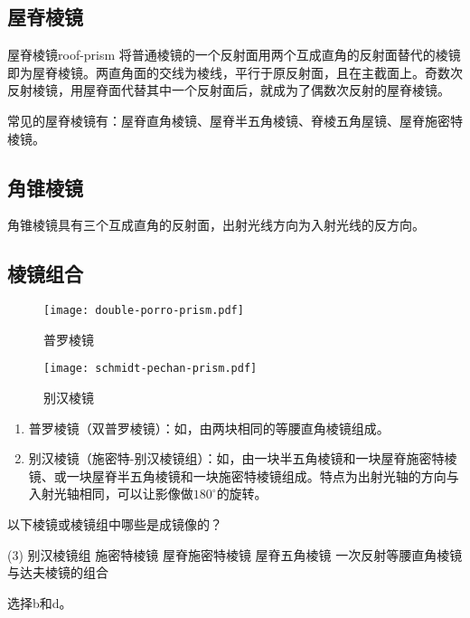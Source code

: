 \documentclass[cn,10pt,chinesefont=founder,math=mtpro2,cite=super,toc=onecol,twoside,openany]{elegantbook}
\begin{document}
\subsection{屋脊棱镜}

\begin{definition}{屋脊棱镜}{roof-prism}
	将普通棱镜的一个反射面用两个互成直角的反射面替代的棱镜即为屋脊棱镜。两直角面的交线为棱线，平行于原反射面，且在主截面上。奇数次反射棱镜，用屋脊面代替其中一个反射面后，就成为了偶数次反射的屋脊棱镜。
\end{definition}

常见的屋脊棱镜有：屋脊直角棱镜、屋脊半五角棱镜、脊棱五角屋镜、屋脊施密特棱镜。

\subsection{角锥棱镜}
角锥棱镜具有三个互成直角的反射面，出射光线方向为入射光线的反方向。

\subsection{棱镜组合}

\begin{figure}[htbp]
	\centering
	\begin{minipage}[t]{0.45\textwidth}
		\centering
		\texttt{[image: double-porro-prism.pdf]}
		\caption{普罗棱镜}
		\label{fig:double-porro-prism}
	\end{minipage}
	\qquad
	\begin{minipage}[t]{0.45\textwidth}
		\centering
		\texttt{[image: schmidt-pechan-prism.pdf]}
		\caption{别汉棱镜}
		\label{fig:schmidt-pechan-prism}
	\end{minipage}
\end{figure}

\begin{enumerate}
	\item 普罗棱镜（双普罗棱镜）：如，由两块相同的等腰直角棱镜组成。
	\item 别汉棱镜（施密特-别汉棱镜组）：如，由一块半五角棱镜和一块屋脊施密特棱镜、或一块屋脊半五角棱镜和一块施密特棱镜组成。特点为出射光轴的方向与入射光轴相同，可以让影像做$180^{\circ}$的旋转。
\end{enumerate}

\begin{problem}
	以下棱镜或棱镜组中哪些是成镜像的？
	\begin{tasks}(3)
		\task 别汉棱镜组
		\task 施密特棱镜
		\task 屋脊施密特棱镜
		\task 屋脊五角棱镜
		\task* 一次反射等腰直角棱镜与达夫棱镜的组合
	\end{tasks}
\end{problem}
\begin{solution}
	选择b和d。
\end{solution}
\end{document}
